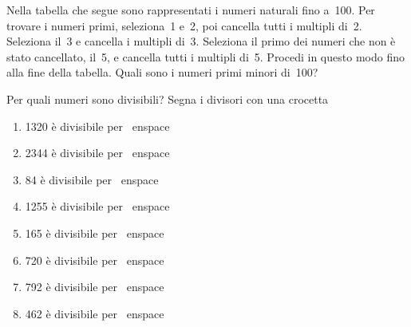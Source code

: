 \begin{esercizio}
\begin{multicols}{2}
Nella tabella che segue sono rappresentati i numeri naturali fino a~100. Per 
trovare i
numeri primi, seleziona~1 e~2, poi cancella tutti i multipli di~2. Seleziona 
il~3 e cancella i multipli di~3. Seleziona il
primo dei numeri che non è stato cancellato, il~5, e cancella
tutti i multipli di~5. Procedi in questo modo fino alla fine
della tabella. Quali sono i numeri primi minori di~100?

\columnbreak\vfil
\eratostene
% 
\end{multicols}
\end{esercizio}

\begin{esercizio}
 Per quali numeri sono divisibili? Segna i divisori con una crocetta
\TabPositions{3.5cm}
 \begin{enumerate}[noitemsep, label=(\alph*)]
 \item 1320 è divisibile per 
\tab{}\enspace{}\enspace{}\enspace{}\enspace{}\
enspace\enspace{}\enspace{}\enspace{}\enspace{}
 \item 2344 è divisibile per 
\tab{}\enspace{}\enspace{}\enspace{}\enspace{}\
enspace\enspace{}\enspace{}\enspace{}\enspace{}
 \item 84 è divisibile per 
\tab{}\enspace{}\enspace{}\enspace{}\enspace{}\
enspace\enspace{}\enspace{}\enspace{}\enspace{}
 \item 1255 è divisibile per 
\tab{}\enspace{}\enspace{}\enspace{}\enspace{}\
enspace\enspace{}\enspace{}\enspace{}\enspace{}
 \item 165 è divisibile per 
\tab{}\enspace{}\enspace\fbox{4}\enspace\fbox{5}\enspace\fbox{6}\
enspace\enspace{}\enspace{}\enspace{}\enspace{}
 \item 720 è divisibile per 
\tab\fbox{2}\enspace\fbox{3}\enspace{}\enspace{}\enspace{}\
enspace\enspace{}\enspace{}\enspace{}\enspace{}
 \item 792 è divisibile per 
\tab{}\enspace{}\enspace{}\enspace{}\enspace{}\
enspace\enspace{}\enspace{}\enspace{}\enspace\fbox{
11}
 \item 462 è divisibile per 
\tab\fbox{2}\enspace\fbox{3}\enspace\fbox{4}\enspace\fbox{5}\enspace\fbox{6}\
enspace\enspace{}\enspace{}\enspace{}\enspace\fbox{
11}
 \end{enumerate}
\end{esercizio}

